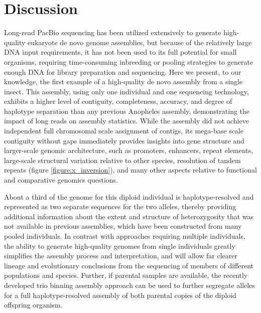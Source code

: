 \section{Discussion}

\par{
Long-read PacBio sequencing has been utilized extensively to generate high-quality eukaryote de novo genome assemblies, but because of the relatively large DNA input requirements, it has not been used to its full potential for small organisms, requiring time-consuming inbreeding or pooling strategies to generate enough DNA for library preparation and sequencing. Here we present, to our knowledge, the first example of a high-quality de novo assembly from a single insect. This assembly, using only one individual and one sequencing technology, exhibits a higher level of contiguity, completeness, accuracy, and degree of haplotype separation than any previous Anopheles assembly, demonstrating the impact of long reads on assembly statistics. While the assembly did not achieve independent full chromosomal scale assignment of contigs, its mega-base scale contiguity without gaps immediately provides insights into gene structure and larger-scale genomic architecture, such as promoters, enhancers, repeat elements, large-scale structural variation relative to other species, resolution of tandem repeats (figure \ref{figure:x_inversion}), and many other aspects relative to functional and comparative genomics questions.
}
\par{
About a third of the genome for this diploid individual is haplotype-resolved and represented as two separate sequences for the two alleles, thereby providing additional information about the extent and structure of heterozygosity that was not available in previous assemblies, which have been constructed from many pooled individuals. In contrast with approaches requiring multiple individuals, the ability to generate high-quality genomes from single individuals greatly simplifies the assembly process and interpretation, and will allow far clearer lineage and evolutionary conclusions from the sequencing of members of different populations and species. Further, if parental samples are available, the recently developed trio binning assembly approach \cite{triobinning} can be used to further segregate alleles for a full haplotype-resolved assembly of both parental copies of the diploid offspring organism.
}
